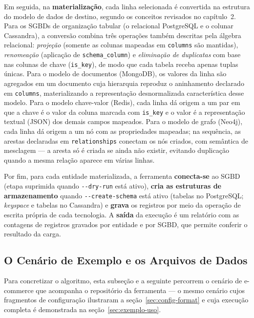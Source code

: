 Em seguida, na \textbf{materialização}, cada linha selecionada é convertida na estrutura
do modelo de dados de destino, segundo os conceitos revisados no capítulo~2. Para os
SGBDs de organização tabular (o relacional PostgreSQL e o colunar Cassandra), a conversão
combina três operações também descritas pela álgebra relacional: \textit{projeção}
(somente as colunas mapeadas em \texttt{columns} são mantidas), \textit{renomeação}
(aplicação de \texttt{schema\_column}) e \textit{eliminação de duplicatas} com base nas
colunas de chave (\texttt{is\_key}), de modo que cada tabela receba apenas tuplas únicas.
Para o modelo de documentos (MongoDB), os valores da linha são agregados em um documento
cuja hierarquia reproduz o aninhamento declarado em \texttt{columns}, materializando a
representação desnormalizada característica desse modelo. Para o modelo chave-valor
(Redis), cada linha dá origem a um par em que a chave é o valor da coluna marcada com
\texttt{is\_key} e o valor é a representação textual (JSON) dos demais campos mapeados.
Para o modelo de grafo (Neo4j), cada linha dá origem a um nó com as propriedades mapeadas;
na sequência, as arestas declaradas em \texttt{relationships} conectam os nós criados, com
semântica de mesclagem --- a aresta só é criada se ainda não existir, evitando duplicação
quando a mesma relação aparece em várias linhas.

Por fim, para cada entidade materializada, a ferramenta \textbf{conecta-se} ao SGBD
(etapa suprimida quando \texttt{-{}-dry-run} está ativo), \textbf{cria as estruturas de
armazenamento} quando \texttt{-{}-create-schema} está ativo (tabelas no PostgreSQL;
\textit{keyspace} e tabelas no Cassandra) e \textbf{grava} os registros por meio da
operação de escrita própria de cada tecnologia. A \textbf{saída} da execução é um
relatório com as contagens de registros gravados por entidade e por SGBD, que permite
conferir o resultado da carga.

\subsection{O Cenário de Exemplo e os Arquivos de Dados}
\label{sec:exemplo-linha}

Para concretizar o algoritmo, esta subseção e a seguinte percorrem o cenário de
e-commerce que acompanha o repositório da ferramenta --- o mesmo cenário cujos
fragmentos de configuração ilustraram a seção~\ref{sec:config-format} e cuja execução
completa é demonstrada na seção~\ref{sec:exemplo-uso}.

